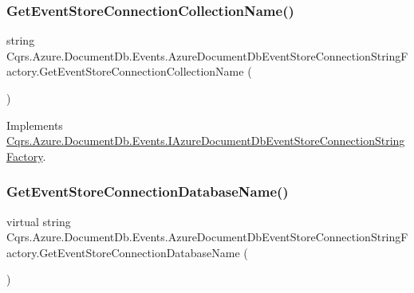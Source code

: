 \subsubsection{\texorpdfstring{Get\+Event\+Store\+Connection\+Collection\+Name()}{GetEventStoreConnectionCollectionName()}}
{\footnotesize\ttfamily string Cqrs.\+Azure.\+Document\+Db.\+Events.\+Azure\+Document\+Db\+Event\+Store\+Connection\+String\+Factory.\+Get\+Event\+Store\+Connection\+Collection\+Name (\begin{DoxyParamCaption}{ }\end{DoxyParamCaption})}



Implements \hyperlink{interfaceCqrs_1_1Azure_1_1DocumentDb_1_1Events_1_1IAzureDocumentDbEventStoreConnectionStringFactory_a4268ad0884bad88528a5eb10292d9d3b}{Cqrs.\+Azure.\+Document\+Db.\+Events.\+I\+Azure\+Document\+Db\+Event\+Store\+Connection\+String\+Factory}.

\mbox{\label{classCqrs_1_1Azure_1_1DocumentDb_1_1Events_1_1AzureDocumentDbEventStoreConnectionStringFactory_af243f79315140e1f2c20a5c1695f4fb9}} 
\subsubsection{\texorpdfstring{Get\+Event\+Store\+Connection\+Database\+Name()}{GetEventStoreConnectionDatabaseName()}}
{\footnotesize\ttfamily virtual string Cqrs.\+Azure.\+Document\+Db.\+Events.\+Azure\+Document\+Db\+Event\+Store\+Connection\+String\+Factory.\+Get\+Event\+Store\+Connection\+Database\+Name (\begin{DoxyParamCaption}{ }\end{DoxyParamCaption})\hspace{0.3cm}{\ttfamily [virtual]}}



